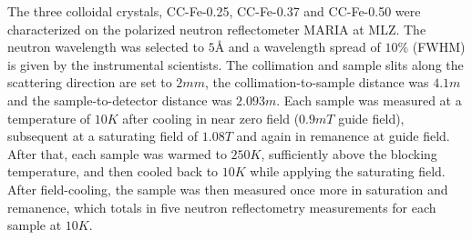 \documentclass[\main/dresen_thesis.tex]{subfiles}
\begin{document}



    The three colloidal crystals, CC-Fe-0.25, CC-Fe-0.37 and CC-Fe-0.50 were characterized on the polarized neutron reflectometer MARIA at MLZ.
    The neutron wavelength was selected to $5 \unit{\angstrom}$ and a wavelength spread of $10 \unit{\%}$ (FWHM) is given by the instrumental scientists.
    The collimation and sample slits along the scattering direction are set to $2 \unit{mm}$, the collimation-to-sample distance was $4.1 \unit{m}$ and the sample-to-detector distance was $2.093 \unit{m}$.
    Each sample was measured at a temperature of $10 \unit{K}$ after cooling in near zero field ($0.9 \unit{mT}$ guide field), subsequent at a saturating field of $1.08 \unit{T}$ and again in remanence at guide field.
    After that, each sample was warmed to $250 \unit{K}$, sufficiently above the blocking temperature, and then cooled back to $10 \unit{K}$ while applying the saturating field.
    After field-cooling, the sample was then measured once more in saturation and remanence, which totals in five neutron reflectometry measurements for each sample at $10 \unit{K}$.
\end{document}
